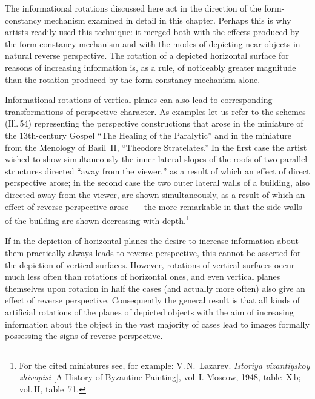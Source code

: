 


The informational rotations discussed here act in the direction of the form-constancy
mechanism examined in detail in this chapter.  Perhaps this is why artists readily
used this technique: it merged both with the effects produced by the form-constancy
mechanism and with the modes of depicting near objects in natural reverse perspective.
The rotation of a depicted horizontal surface for reasons of increasing information
is, as a rule, of noticeably greater magnitude than the rotation produced by the
form-constancy mechanism alone.

Informational rotations of vertical planes can also lead to corresponding
transformations of perspective character.  As examples let us refer to the schemes
(Ill.\,54) representing the perspective constructions that arose in the miniature of
the 13th-century Gospel ``The Healing of the Paralytic'' and in the miniature from
the Menology of Basil~II, ``Theodore Stratelates.''  In the first case the artist
wished to show simultaneously the inner lateral slopes of the roofs of two parallel
structures directed ``away from the viewer,'' as a result of which an effect of direct
perspective arose; in the second case the two outer lateral walls of a building, also
directed away from the viewer, are shown simultaneously, as a result of which an
effect of reverse perspective arose~--- the more remarkable in that the side walls of
the building are shown decreasing with depth.\footnote{For the cited miniatures see,
  for example: V.\,N.~Lazarev.  \emph{Istoriya vizantiyskoy zhivopisi} [A History of
  Byzantine Painting], vol.\,I.  Moscow, 1948, table~X\,b; vol.\,II, table~71.}



If in the depiction of horizontal planes the desire to increase information about them
practically always leads to reverse perspective, this cannot be asserted for the
depiction of vertical surfaces.  However, rotations of vertical surfaces occur much
less often than rotations of horizontal ones, and even vertical planes themselves upon
rotation in half the cases (and actually more often) also give an effect of reverse
perspective.  Consequently the general result is that all kinds of artificial rotations
of the planes of depicted objects with the aim of increasing information about the
object in the vast majority of cases lead to images formally possessing the signs of
reverse perspective.

